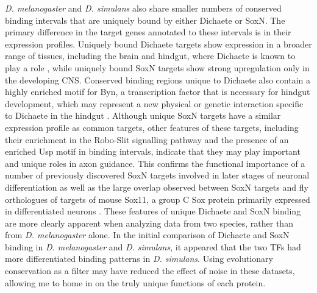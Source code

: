 \emph{D. melanogaster} and \emph{D. simulans} also share smaller numbers of conserved binding intervals that are uniquely bound by either Dichaete or SoxN. The primary difference in the target genes annotated to these intervals is in their expression profiles. Uniquely bound Dichaete targets show expression in a broader range of tissues, including the brain and hindgut, where Dichaete is known to play a role \citep{sanchez-soriano_regulatory_2000}, while uniquely bound SoxN targets show strong upregulation only in the developing CNS. Conserved binding regions unique to Dichaete also contain a highly enriched motif for Byn, a transcription factor that is necessary for hindgut development, which may represent a new physical or genetic interaction specific to Dichaete in the hindgut \citep{kispert_homologs_1994,murakami_developmental_1999}. Although unique SoxN targets have a similar expression profile as common targets, other features of these targets, including their enrichment in the Robo-Slit signalling pathway and the presence of an enriched Usp motif in binding intervals, indicate that they may play important and unique roles in axon guidance. This confirms the functional importance of a number of previously discovered SoxN targets involved in later stages of neuronal differentiation as well as the large overlap observed between SoxN targets and fly orthologues of targets of mouse Sox11, a group C Sox protein primarily expressed in differentiated neurons \citep{bergsland_sequentially_2011,ferrero_soxneuro_2014}. These features of unique Dichaete and SoxN binding are more clearly apparent when analyzing data from two species, rather than from \emph{D. melanogaster} alone. In the initial comparison of Dichaete and SoxN binding in \emph{D. melanogaster} and \emph{D. simulans}, it appeared that the two TFs had more differentiated binding patterns in \emph{D. simulans}. Using evolutionary conservation as a filter may have reduced the effect of noise in these datasets, allowing me to home in on the truly unique functions of each protein.\\

